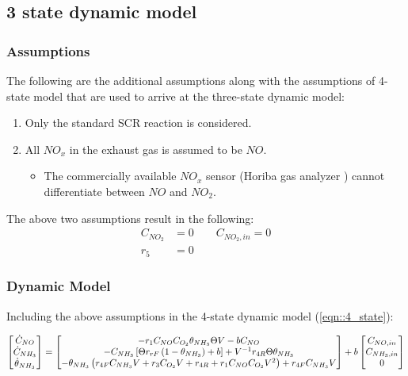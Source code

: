 \subsection{3 state dynamic model}
\subsubsection{Assumptions }
The following are the additional assumptions along with the assumptions of
4-state model that are used to arrive at the three-state dynamic model\cite{devarakonda2009model}:
\begin{enumerate}
    \item Only the standard SCR reaction is considered.
    \item All $NO_x$ in the exhaust gas is assumed to be $NO$.
    \begin{itemize}
        \item The commercially available $NO_x$ sensor (Horiba gas analyzer \cite{nova2014urea}) cannot differentiate between $NO$ and $NO_2$.
    \end{itemize}
\end{enumerate}
The above two assumptions result in the following:
\begin{align*}
    C_{NO_2} &= 0 \qquad C_{NO_2,  in} = 0\\
    r_5 &= 0
\end{align*}

\subsubsection{Dynamic Model}
Including the above assumptions in the 4-state dynamic model
(\ref{eqn::4_state}):

\begin{equation} \label{eqn::3_state}
    \begin{bmatrix} \dot C_{NO} \\
        \dot C_{NH_3}\\
        \dot \theta_{NH_3}\\
         \end{bmatrix} =
    \begin{bmatrix} 
        -r_1 C_{NO} C_{O_2} \theta_{NH_3} \Theta V
        -b C_{NO}\\
        -C_{NH_3} \left[ \Theta r_{rF} \left( 1 - \theta_{NH_3} \right) + b \right] + V^{-1} r_{4R} \Theta \theta_{NH_3}\\
        -\theta_{NH_3} \left( r_{4F}C_{NH_3} V + r_3 C_{O_2}V + r_{4R} + r_1 C_{NO} C_{O_2} V^2  \right) + r_{4F} C_{NH_3} V
     \end{bmatrix}
    + b \begin{bmatrix} C_{NO, in} \\ C_{NH_3, in} \\ 0 \end{bmatrix}
\end{equation}

